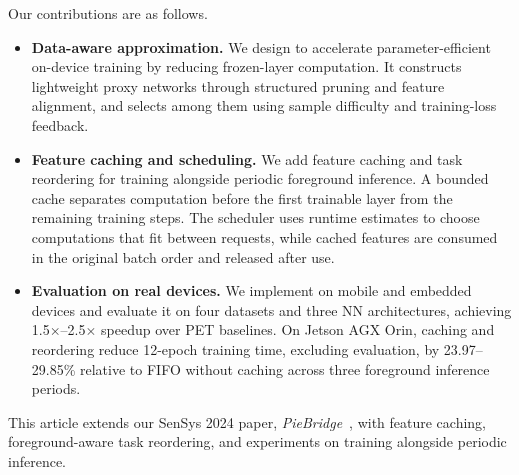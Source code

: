 \begingroup
\color{blue}
Our contributions are as follows.
\begin{itemize}[leftmargin=10pt,topsep=0pt]
\item \textbf{Data-aware approximation.} We design \sys to accelerate parameter-efficient on-device training by reducing frozen-layer computation. It constructs lightweight proxy networks through structured pruning and feature alignment, and selects among them using sample difficulty and training-loss feedback.
\item \textbf{Feature caching and scheduling.} We add feature caching and task reordering for training alongside periodic foreground inference. A bounded cache separates computation before the first trainable layer from the remaining training steps. The scheduler uses runtime estimates to choose computations that fit between requests, while cached features are consumed in the original batch order and released after use.
\item \textbf{Evaluation on real devices.} We implement \sys on mobile and embedded devices and evaluate it on four datasets and three NN architectures, achieving 1.5$\times$--2.5$\times$ speedup over PET baselines. On Jetson AGX Orin, caching and reordering reduce 12-epoch training time, excluding evaluation, by 23.97--29.85\% relative to FIFO without caching across three foreground inference periods.
\end{itemize}
This article extends our SenSys 2024 paper, \textit{PieBridge}~\cite{yin2024piebridge}, with feature caching, foreground-aware task reordering, and experiments on training alongside periodic inference.
\par
\endgroup




